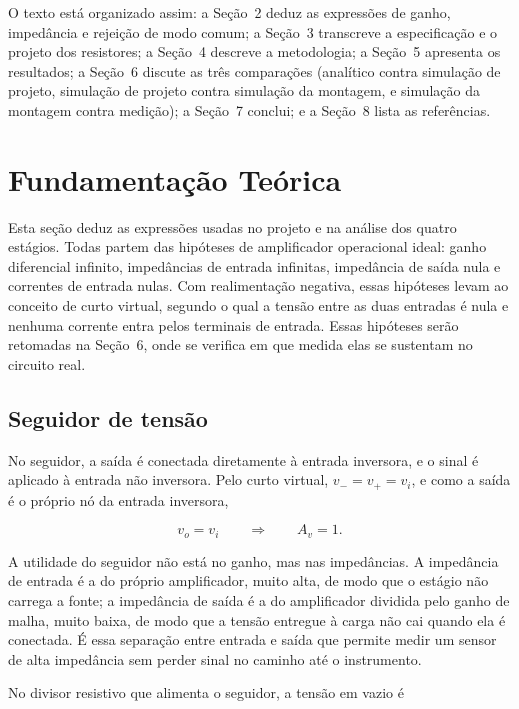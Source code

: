 \documentclass[11pt,a4paper]{article}
\begin{document}
O texto está organizado assim: a Seção~2 deduz as expressões de ganho, impedância e rejeição de modo comum; a Seção~3 transcreve a especificação e o projeto dos resistores; a Seção~4 descreve a metodologia; a Seção~5 apresenta os resultados; a Seção~6 discute as três comparações (analítico contra simulação de projeto, simulação de projeto contra simulação da montagem, e simulação da montagem contra medição); a Seção~7 conclui; e a Seção~8 lista as referências.

\section{Fundamentação Teórica}

Esta seção deduz as expressões usadas no projeto e na análise dos quatro estágios. Todas partem das hipóteses de amplificador operacional ideal: ganho diferencial infinito, impedâncias de entrada infinitas, impedância de saída nula e correntes de entrada nulas. Com realimentação negativa, essas hipóteses levam ao conceito de curto virtual, segundo o qual a tensão entre as duas entradas é nula e nenhuma corrente entra pelos terminais de entrada. Essas hipóteses serão retomadas na Seção~6, onde se verifica em que medida elas se sustentam no circuito real.

\subsection{Seguidor de tensão}

No seguidor, a saída é conectada diretamente à entrada inversora, e o sinal é aplicado à entrada não inversora. Pelo curto virtual, $v_- = v_+ = v_i$, e como a saída é o próprio nó da entrada inversora,

\begin{equation}
v_o = v_i \qquad \Rightarrow \qquad A_v = 1 .
\label{eq:seguidor}
\end{equation}

A utilidade do seguidor não está no ganho, mas nas impedâncias. A impedância de entrada é a do próprio amplificador, muito alta, de modo que o estágio não carrega a fonte; a impedância de saída é a do amplificador dividida pelo ganho de malha, muito baixa, de modo que a tensão entregue à carga não cai quando ela é conectada. É essa separação entre entrada e saída que permite medir um sensor de alta impedância sem perder sinal no caminho até o instrumento.

No divisor resistivo que alimenta o seguidor, a tensão em vazio é
\end{document}
